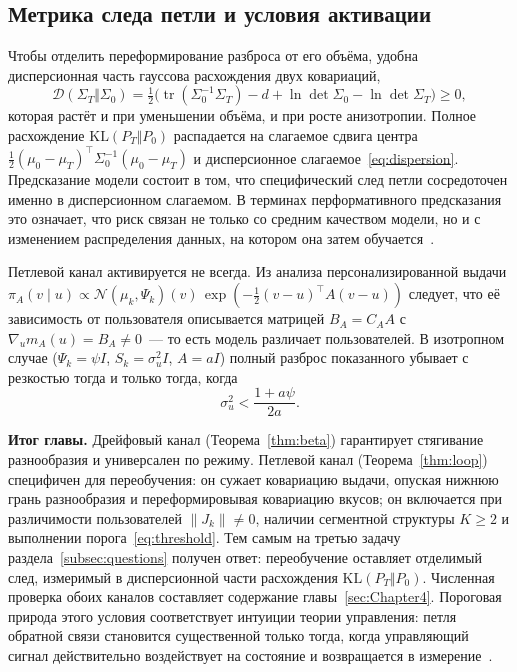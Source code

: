 \subsection{Метрика следа петли и условия активации}
\label{subsec:metric}

Чтобы отделить переформирование разброса от его объёма, удобна дисперсионная
часть гауссова расхождения двух ковариаций,
\begin{equation}
    \mathcal D(\Sigma_T\Vert\Sigma_0)=\tfrac12\bigl(
    \operatorname{tr}(\Sigma_0^{-1}\Sigma_T)-d
    +\ln\det\Sigma_0-\ln\det\Sigma_T\bigr)\ge0,
    \label{eq:dispersion}
\end{equation}
которая растёт и при уменьшении объёма, и при росте анизотропии. Полное
расхождение $\mathrm{KL}(P_T\Vert P_0)$ распадается на слагаемое сдвига центра
$\tfrac12(\mu_0-\mu_T)^\top\Sigma_0^{-1}(\mu_0-\mu_T)$ и
дисперсионное слагаемое~\eqref{eq:dispersion}. Предсказание модели состоит в том,
что специфический след петли сосредоточен именно в дисперсионном слагаемом. В
терминах перформативного предсказания это означает, что риск связан не только со
средним качеством модели, но и с изменением распределения данных, на котором
она затем обучается~\cite{perdomo2020, hardt2025performativePastFuture,
brown2022stateful}.

Петлевой канал активируется не всегда. Из анализа персонализированной выдачи
$\pi_A(v\mid u)\propto\mathcal N(\mu_k,\Psi_k)(v)\,\exp(-\tfrac12(v-u)^\top
A(v-u))$ следует, что её зависимость от пользователя описывается матрицей
$B_A=C_A A$ с $\nabla_u m_A(u)=B_A\ne0$~--- то есть модель различает
пользователей. В изотропном случае ($\Psi_k=\psi I$, $S_k=\sigma_u^2 I$,
$A=aI$) полный разброс показанного убывает с резкостью тогда и только тогда,
когда
\begin{equation}
    \sigma_u^2 < \frac{1+a\psi}{2a}.
    \label{eq:threshold}
\end{equation}

\textbf{Итог главы.} Дрейфовый канал (Теорема~\ref{thm:beta}) гарантирует
стягивание разнообразия и универсален по режиму. Петлевой канал
(Теорема~\ref{thm:loop}) специфичен для переобучения: он сужает ковариацию
выдачи, опуская нижнюю грань разнообразия и переформировывая ковариацию вкусов;
он включается при различимости пользователей $\lVert J_k\rVert\neq0$, наличии
сегментной структуры $K\ge2$ и выполнении порога~\eqref{eq:threshold}. Тем самым
на третью задачу раздела~\ref{subsec:questions} получен ответ: переобучение
оставляет отделимый след, измеримый в дисперсионной части расхождения
$\mathrm{KL}(P_T\Vert P_0)$. Численная проверка обоих каналов составляет
содержание главы~\ref{sec:Chapter4}. Пороговая природа этого условия
соответствует интуиции теории управления: петля обратной связи становится существенной
только тогда, когда управляющий сигнал действительно воздействует на состояние и
возвращается в измерение~\cite{sprenger2024controlStrategies,
depasquale2026controlSystems}.
